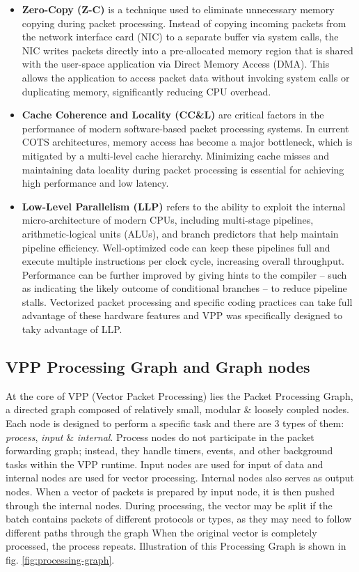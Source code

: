 \begin{itemize}
  \item \textbf{Zero-Copy (Z-C)} 
is a technique used to eliminate unnecessary memory copying during packet processing. 
Instead of copying incoming packets from the network interface card (NIC) to a separate buffer via system calls, 
the NIC writes packets directly into a pre-allocated memory region that is shared with the user-space application via Direct Memory Access (DMA). 
This allows the application to access packet data without invoking system calls or duplicating memory, significantly reducing CPU overhead. 

  \item \textbf {Cache Coherence and Locality (CC\&L)} are critical factors in the performance of modern software-based packet processing systems. 
In current COTS architectures, memory access has become a major bottleneck, which is mitigated by a multi-level cache hierarchy.
Minimizing cache misses and maintaining data locality during packet processing is essential for achieving high performance and low latency.

  \item \textbf {Low-Level Parallelism (LLP)} 
refers to the ability to exploit the internal micro-architecture of modern CPUs, including multi-stage pipelines, arithmetic-logical units (ALUs), and branch predictors that help maintain pipeline efficiency. 
Well-optimized code can keep these pipelines full and execute multiple instructions per clock cycle, increasing overall throughput. 
Performance can be further improved by giving hints to the compiler -- such as indicating the likely outcome of conditional branches -- to reduce pipeline stalls. 
Vectorized packet processing and specific coding practices can take full advantage of these hardware features and VPP was specifically designed to taky advantage of LLP.

\end{itemize}

\subsection{VPP Processing Graph and Graph nodes}
At the core of VPP (Vector Packet Processing) lies the Packet Processing Graph, a directed graph composed of relatively small, modular \& loosely coupled nodes. 
Each node is designed to perform a specific task and there are 3 types of them: \textit{process}, \textit{input} \& \textit{internal}. 
Process nodes do not participate in the packet forwarding graph; instead, they handle timers, events, and other background tasks within the VPP runtime.
Input nodes are used for input of data and internal nodes are used for vector processing. Internal nodes also serves as output nodes. 
When a vector of packets is prepared by input node, it is then pushed through the internal nodes. 
During processing, the vector may be split if the batch contains packets of different protocols or types, as they may need to follow different paths through the graph
When the original vector is completely processed, the process repeats.
Illustration of this Processing Graph is shown in fig. \ref{fig:processing-graph}.

